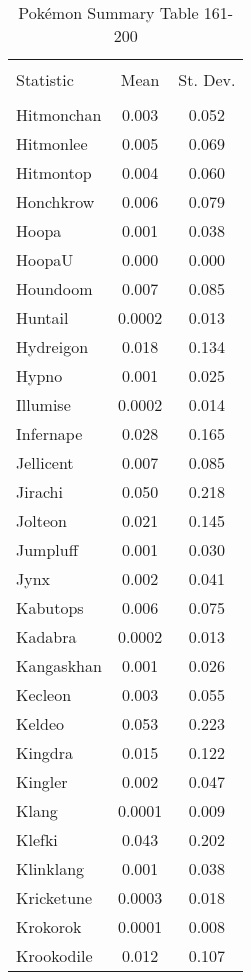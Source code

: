 \documentclass[12pt,twoside]{reedthesis}
\begin{document}
  \begin{table}[!htbp] \centering 
    \caption{Pokémon Summary Table 161-200} 
    \label{} 
  \begin{tabular}{@{\extracolsep{5pt}}lcc} 
  \\[-1.8ex]\hline 
  \hline \\[-1.8ex] 
  Statistic & \multicolumn{1}{c}{Mean} & \multicolumn{1}{c}{St. Dev.} \\ 
  \hline \\[-1.8ex] 
  Hitmonchan & 0.003 & 0.052 \\ 
  Hitmonlee & 0.005 & 0.069 \\ 
  Hitmontop & 0.004 & 0.060 \\ 
  Honchkrow & 0.006 & 0.079 \\ 
  Hoopa & 0.001 & 0.038 \\ 
  HoopaU & 0.000 & 0.000 \\ 
  Houndoom & 0.007 & 0.085 \\ 
  Huntail & 0.0002 & 0.013 \\ 
  Hydreigon & 0.018 & 0.134 \\ 
  Hypno & 0.001 & 0.025 \\ 
  Illumise & 0.0002 & 0.014 \\ 
  Infernape & 0.028 & 0.165 \\ 
  Jellicent & 0.007 & 0.085 \\ 
  Jirachi & 0.050 & 0.218 \\ 
  Jolteon & 0.021 & 0.145 \\ 
  Jumpluff & 0.001 & 0.030 \\ 
  Jynx & 0.002 & 0.041 \\ 
  Kabutops & 0.006 & 0.075 \\ 
  Kadabra & 0.0002 & 0.013 \\ 
  Kangaskhan & 0.001 & 0.026 \\ 
  Kecleon & 0.003 & 0.055 \\ 
  Keldeo & 0.053 & 0.223 \\ 
  Kingdra & 0.015 & 0.122 \\ 
  Kingler & 0.002 & 0.047 \\ 
  Klang & 0.0001 & 0.009 \\ 
  Klefki & 0.043 & 0.202 \\ 
  Klinklang & 0.001 & 0.038 \\ 
  Kricketune & 0.0003 & 0.018 \\ 
  Krokorok & 0.0001 & 0.008 \\ 
  Krookodile & 0.012 & 0.107 \\ 

\end{tabular}
\end{table}
\end{document}
